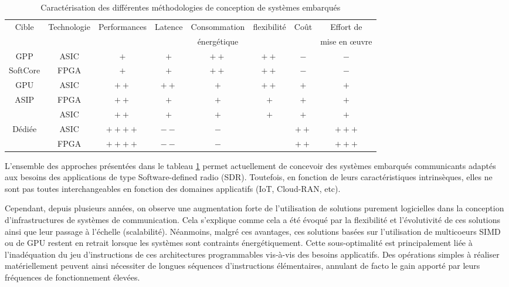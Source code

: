 \documentclass[../main.tex]{subfiles}
\begin{document}
\begin{table}
    \footnotesize
    \centering
    \begin{tabular}{c|ccccccc}
        \toprule
        \multirow{2}{*}{Cible} & \multirow{2}{*}{Technologie} & \multirow{2}{*}{Performances} & \multirow{2}{*}{Latence} & Consommation & \multirow{2}{*}{flexibilité} & \multirow{2}{*}{Coût} & Effort de \\
              &             &              &         & énergétique  &             &      & mise en œuvre \\
        \bottomrule
        GPP                     & ASIC  & $+$  & $+$  & $++$ & $++$ & $-$  & $-$ \\
        SoftCore                & FPGA  & $+$  & $+$  & $++$ & $++$ & $-$  & $-$ \\
        GPU                     & ASIC  & $++$  & $++$ & $+$  & $++$ & $+$  & $+$ \\
        \bottomrule
        \multirow{2}{*}{ASIP}   & FPGA & $++$   & $+$  & $+$  & $+$  & $+$  & $+$ \\
                                & ASIC & $++$   & $+$  & $+$  & $+$  & $+$  & $+$ \\
        \bottomrule
        \multirow{2}{*}{Dédiée} & ASIC & $++++$ & $--$ & $-$  &      & $++$ & $+++$ \\
                                & FPGA & $++++$ & $--$ & $-$  &      & $++$ & $+++$ \\
        
        \bottomrule
    \end{tabular}
    \caption{Caractérisation des différentes méthodologies de conception de systèmes embarqués}
    \label{tab:archis}
\end{table}

L’ensemble des approches présentées dans le tableau \ref{tab:archis} permet actuellement de concevoir des systèmes embarqués communicants adaptés aux besoins des applications de type Software-defined radio (SDR). Toutefois, en fonction de leurs caractéristiques intrinsèques, elles ne sont pas toutes interchangeables en fonction des domaines applicatifs (IoT, Cloud-RAN, etc).

Cependant, depuis plusieurs années, on observe une augmentation forte de l'utilisation de solutions purement logicielles dans la conception d'infrastructures de systèmes de communication. Cela s'explique comme cela a été évoqué par la flexibilité et l'évolutivité de ces solutions ainsi que leur passage à l'échelle (scalabilité). Néanmoins, malgré ces avantages, ces solutions basées sur l'utilisation de multicoeurs SIMD ou de GPU restent en retrait lorsque les systèmes sont contraints énergétiquement. Cette sous-optimalité est principalement liée à l'inadéquation du jeu d'instructions de ces architectures programmables vis-à-vis des besoins applicatifs. Des opérations simples à réaliser matériellement peuvent ainsi nécessiter de longues séquences d'instructions élémentaires, annulant de facto le gain apporté par leurs fréquences de fonctionnement élevées.  
\end{document}
